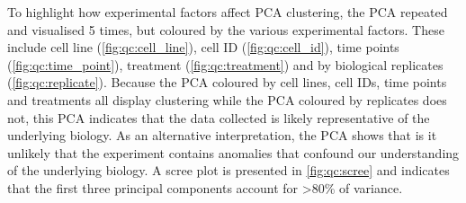 \documentclass[alpha-refs]{wiley-article}
\begin{document}
To highlight how experimental factors affect PCA clustering, the PCA repeated and visualised 5 times, but coloured by the various experimental factors. These include cell line (\cref{fig:qc:cell_line}), cell ID (\cref{fig:qc:cell_id}), time points (\cref{fig:qc:time_point}), treatment (\cref{fig:qc:treatment}) and by biological replicates (\cref{fig:qc:replicate}). Because the PCA coloured by cell lines, cell IDs, time points and treatments all display clustering while the PCA coloured by replicates does not, this PCA indicates that the data collected is likely representative of the underlying biology. As an alternative interpretation, the PCA shows that is it unlikely that the experiment contains anomalies that confound our understanding of the underlying biology. A scree plot is presented in \cref{fig:qc:scree} and indicates that the first three principal components account for >80\% of variance.
\end{document}
